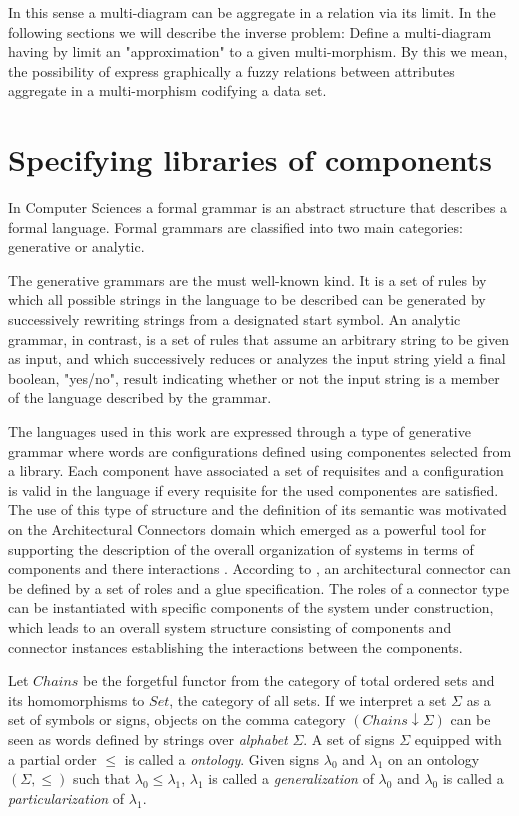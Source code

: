 \documentclass[oribibl]{llncs}
\begin{document}
In this sense a multi-diagram can be aggregate in a relation via its limit. In the following sections we will describe the inverse problem: Define a multi-diagram having by limit an "approximation" to a given multi-morphism. By this we mean, the possibility of express graphically a fuzzy relations between attributes aggregate in a multi-morphism codifying a data set.

\section{Specifying libraries of components}\label{specifying libraries}

In Computer Sciences a formal grammar is an abstract structure that describes a formal language. Formal grammars are classified into two main categories: generative or analytic.

The generative grammars are the must well-known kind. It is a set of rules by which all possible strings in the language to be described can be generated by successively rewriting strings from a designated start symbol. An analytic grammar, in contrast, is a set of rules that assume an arbitrary string to be given as input, and which successively reduces or analyzes the input string yield a final boolean, "yes/no", result indicating whether or not the input string is a member of the language described by the grammar.

The languages used in this work are expressed through a type of generative grammar where words are configurations defined using componentes selected from a library. Each component have associated a set of requisites and a configuration is valid in the language if every requisite for the used componentes are satisfied. The use of this type of structure and the definition of its semantic was motivated on the Architectural Connectors domain which emerged as a powerful tool for supporting the description of the overall organization of systems in terms of components and there interactions \cite{Fiadeiro97} \cite{Bass98} \cite{Perry92}. According to \cite{Allen97}, an architectural connector can be defined by a set of roles and a glue specification. The roles of a connector type can be instantiated with specific components of the system under construction, which leads to an overall system structure consisting of components and connector instances establishing the interactions between the components.

Let $Chains$ be the forgetful functor from the category of total ordered sets and its
homomorphisms to $Set$, the category of all sets. If we interpret a set $\Sigma$ as a set of symbols or signs, objects on the comma category $(Chains\downarrow \Sigma)$ can
be seen as words defined by strings over \emph{alphabet} $\Sigma$. A set of signs $\Sigma$ equipped with a partial order $\leq$ is called a \emph{ontology}. Given signs $\lambda_0$ and $\lambda_1$ on an ontology $(\Sigma,\leq)$ such that $\lambda_0\leq\lambda_1$, $\lambda_1$ is called a \emph{generalization} of $\lambda_0$ and  $\lambda_0$ is called a \emph{particularization} of $\lambda_1$.
\end{document}
